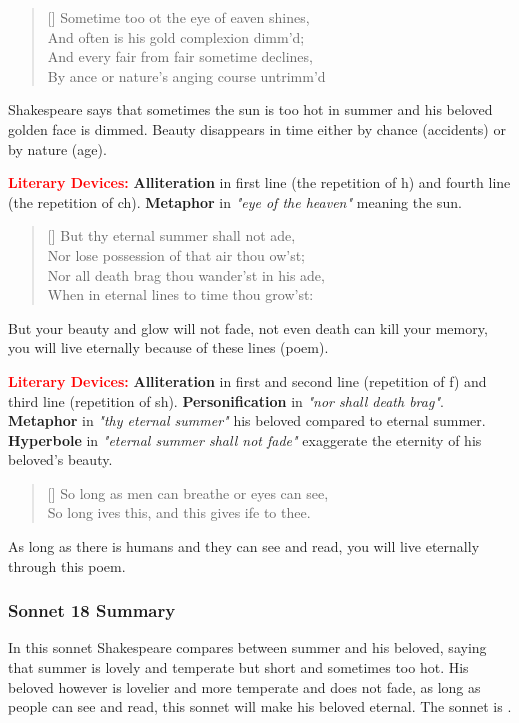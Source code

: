 \documentclass[12pt, a4paper]{article}
\begin{document}
\begin{verse}[\versewidth]
{\fontverse
Sometime too ot the eye of eaven shines, \\
And often is his gold complexion dimm'd; \\
And every fair from fair sometime declines, \\
By ance or nature’s anging course untrimm'd
}
\end{verse}

Shakespeare says that sometimes the sun is too hot in summer and his beloved 
golden face is dimmed. Beauty disappears in time either by 
chance (accidents) or by nature (age).\medbreak

\textbf{\textcolor{red}{Literary Devices:}} \textbf{Alliteration} in first line
(the repetition of h) and fourth line (the repetition of ch). \textbf{Metaphor} in 
\textit{"eye of the heaven"} meaning the sun. 

\begin{verse}[\versewidth]
{\fontverse
But thy eternal summer shall not ade, \\
Nor lose possession of that air thou ow’st; \\
Nor all death brag thou wander’st in his ade, \\
When in eternal lines to time thou grow’st:
}
\end{verse}
But your beauty and glow will not fade, not even death can
kill your memory, you will live eternally because of these
lines (poem).\medbreak

\textbf{\textcolor{red}{Literary Devices:}} \textbf{Alliteration} in first and second line
(repetition  of f) and third line (repetition of sh). \textbf{Personification} in
\textit{"nor shall death brag"}. \textbf{Metaphor} in \textit{"thy eternal summer"} his 
beloved compared to eternal summer. \textbf{Hyperbole} in \textit{"eternal summer shall not fade"}
exaggerate the eternity of his beloved's beauty.

\begin{verse}[\versewidth]
{\fontverse
So long as men can breathe or eyes can see,\\
So long ives this, and this gives ife to thee.
}
\end{verse}
As long as there is humans and they can see and read,
you will live eternally through this poem.


\subsubsection*{Sonnet 18 Summary}
In this sonnet Shakespeare compares between summer and his beloved, saying that summer is lovely and temperate
but short and sometimes too hot. His beloved however is 
lovelier and more temperate and does not fade, as long as 
people can see and read, this sonnet will make his beloved eternal. The 
sonnet is .
\end{document}
